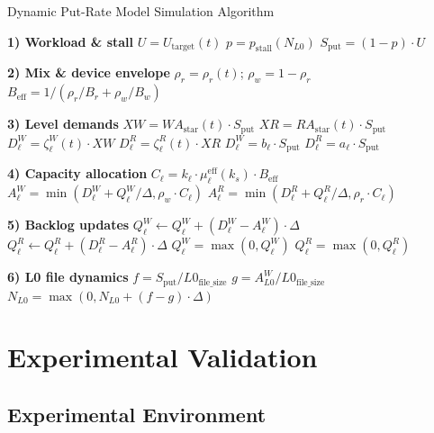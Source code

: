 \documentclass[11pt]{article}
\begin{document}
\begin{algorithm}[H]
\caption{Dynamic Put-Rate Model Simulation Algorithm}
\begin{algorithmic}[1]
\FOR{$t \in [0, T)$ step $\Delta$}
    \STATE \textbf{1) Workload \& stall}
    \STATE $U = U_{\text{target}}(t)$
    \STATE $p = p_{\text{stall}}(N_{L0})$
    \STATE $S_{\text{put}} = (1 - p) \cdot U$
    
    \STATE \textbf{2) Mix \& device envelope}
    \STATE $\rho_r = \rho_r(t)$; $\rho_w = 1 - \rho_r$
    \STATE $B_{\text{eff}} = 1 / (\rho_r/B_r + \rho_w/B_w)$
    
    \STATE \textbf{3) Level demands}
        \STATE $XW = WA_{\text{star}}(t) \cdot S_{\text{put}}$
        \STATE $XR = RA_{\text{star}}(t) \cdot S_{\text{put}}$
        \STATE $D^W_\ell = \zeta^W_\ell(t) \cdot XW$
        \STATE $D^R_\ell = \zeta^R_\ell(t) \cdot XR$
    \ELSE
        \STATE $D^W_\ell = b_\ell \cdot S_{\text{put}}$
        \STATE $D^R_\ell = a_\ell \cdot S_{\text{put}}$
    \ENDIF
    
    \STATE \textbf{4) Capacity allocation}
    \STATE $C_\ell = k_\ell \cdot \mu_\ell^{\text{eff}}(k_s) \cdot B_{\text{eff}}$
    \STATE $A^W_\ell = \min(D^W_\ell + Q^W_\ell/\Delta, \rho_w \cdot C_\ell)$
    \STATE $A^R_\ell = \min(D^R_\ell + Q^R_\ell/\Delta, \rho_r \cdot C_\ell)$
    
    \STATE \textbf{5) Backlog updates}
    \STATE $Q^W_\ell \leftarrow Q^W_\ell + (D^W_\ell - A^W_\ell) \cdot \Delta$
    \STATE $Q^R_\ell \leftarrow Q^R_\ell + (D^R_\ell - A^R_\ell) \cdot \Delta$
    \STATE $Q^W_\ell = \max(0, Q^W_\ell)$
    \STATE $Q^R_\ell = \max(0, Q^R_\ell)$
    
    \STATE \textbf{6) L0 file dynamics}
    \STATE $f = S_{\text{put}} / L0_{\text{file\_size}}$
    \STATE $g = A^W_{L0} / L0_{\text{file\_size}}$
    \STATE $N_{L0} = \max(0, N_{L0} + (f - g) \cdot \Delta)$
\ENDFOR
\end{algorithmic}
\end{algorithm}

\section{Experimental Validation}
\label{sec:experimental_validation}

\subsection{Experimental Environment}
\end{document}
